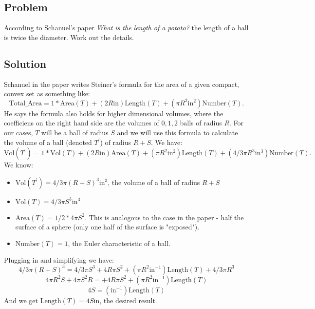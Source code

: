 \documentclass{article}
\begin{document}
\subsection*{Problem}
According to Schanuel's paper \textit{What is the length of a potato?} the length of a ball is twice the diameter. Work out the details.
\subsection*{Solution}
Schanuel in the paper writes Steiner's formula for the area of a given compact, convex set as something like:
\begin{equation*}
\mathrm{Total\_Area} = 1 * \mathrm{Area}(T) + (2R\mathrm{in}) \mathrm{Length} (T) + (\pi R^2 \mathrm{in}^2) \mathrm{Number}(T).
\end{equation*}
He says the formula also holds for higher dimensional volumes, where the coefficiens on the right hand side are the volumes of $0,1,2$ balls of radius $R$.
For our cases, $T$ will be a ball of radius $S$ and we will use this formula to calculate the volume of a ball (denoted $T^\prime$) of radius $R+S$.
We have:
\begin{equation*}
\mathrm{Vol}(T^\prime) = 1 * \mathrm{Vol}(T) + (2R\mathrm{in}) \mathrm{Area} (T) + (\pi R^2 \mathrm{in}^2) \mathrm{Length}(T) + (4/3 \pi R^3 \mathrm{in}^3) \mathrm{Number}(T).
\end{equation*}
We know:
\begin{itemize}
\item $\mathrm{Vol}(T^\prime) = 4/3 \pi (R+S)^3 \mathrm{in}^3$, the volume of a ball of radius $R+S$
\item $\mathrm{Vol}(T) = 4/3 \pi S^3 \mathrm{in}^3$
\item $\mathrm{Area}(T) = 1/2 * 4 \pi S^2$. This is analogous to the case in the paper - half the surface of a sphere (only one half of the surface is "exposed").
\item $\mathrm{Number}(T) = 1$, the Euler characteristic of a ball.
\end{itemize}
Plugging in and simplifying we have:
\begin{equation*}
4/3 \pi (R+S)^3 = 4/3 \pi S^3 + 4R\pi S^2  + (\pi R^2 \mathrm{in}^{-1}) \mathrm{Length}(T) + 4/3 \pi R^3
\end{equation*}
\begin{equation*}
4\pi R^2 S + 4\pi S^2 R= + 4R\pi S^2  + (\pi R^2 \mathrm{in}^{-1}) \mathrm{Length}(T) 
\end{equation*}
\begin{equation*}
4 S =  ( \mathrm{in}^{-1}) \mathrm{Length}(T)
\end{equation*}
And we get $\mathrm{Length}(T) = 4S \mathrm{in}$, the desired result.
\end{document}
